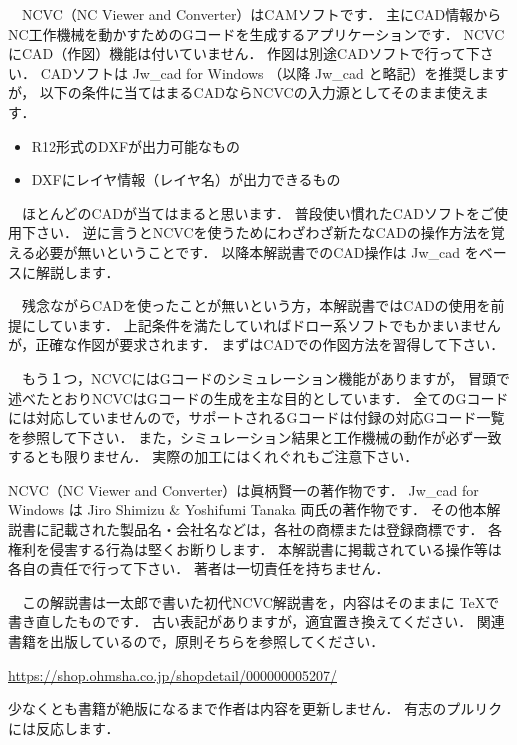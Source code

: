 

\vspace*{2zh}
　NCVC（NC Viewer and Converter）はCAMソフトです．
主にCAD情報からNC工作機械を動かすためのGコードを生成するアプリケーションです．
NCVCにCAD（作図）機能は付いていません．
作図は別途CADソフトで行って下さい．
CADソフトは Jw\_cad for Windows （以降 Jw\_cad と略記）を推奨しますが，
以下の条件に当てはまるCADならNCVCの入力源としてそのまま使えます．

\begin{itemize}
    \item R12形式のDXFが出力可能なもの
    \item DXFにレイヤ情報（レイヤ名）が出力できるもの
\end{itemize}

　ほとんどのCADが当てはまると思います．
普段使い慣れたCADソフトをご使用下さい．
逆に言うとNCVCを使うためにわざわざ新たなCADの操作方法を覚える必要が無いということです．
以降本解説書でのCAD操作は Jw\_cad をベースに解説します．

　残念ながらCADを使ったことが無いという方，本解説書ではCADの使用を前提にしています．
上記条件を満たしていればドロー系ソフトでもかまいませんが，正確な作図が要求されます．
まずはCADでの作図方法を習得して下さい．

　もう１つ，NCVCにはGコードのシミュレーション機能がありますが，
冒頭で述べたとおりNCVCはGコードの生成を主な目的としています．
全てのGコードには対応していませんので，サポートされるGコードは付録の対応Gコード一覧を参照して下さい．
また，シミュレーション結果と工作機械の動作が必ず一致するとも限りません．
実際の加工にはくれぐれもご注意下さい．

\vspace*{2zh}
\begin{center}
\begin{minipage}{10cm}
\begin{screen}
NCVC（NC Viewer and Converter）は眞柄賢一の著作物です．
Jw\_cad for Windows は Jiro Shimizu \& Yoshifumi Tanaka 両氏の著作物です．
その他本解説書に記載された製品名・会社名などは，各社の商標または登録商標です．
各権利を侵害する行為は堅くお断りします．
本解説書に掲載されている操作等は各自の責任で行って下さい．
著者は一切責任を持ちません．  
\end{screen}
\end{minipage}
\end{center}

\vspace*{2zh}
\begin{boxnote}
　この解説書は一太郎で書いた初代NCVC解説書を，内容はそのままに \TeX で書き直したものです．
古い表記がありますが，適宜置き換えてください．
関連書籍を出版しているので，原則そちらを参照してください．
\begin{center}
\url{https://shop.ohmsha.co.jp/shopdetail/000000005207/}
\end{center}
少なくとも書籍が絶版になるまで作者は内容を更新しません．
有志のプルリクには反応します．
\end{boxnote}